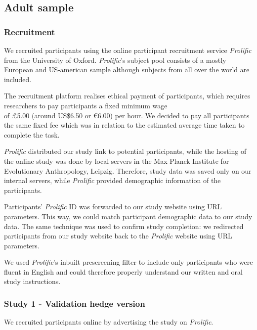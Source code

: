 \documentclass[
  english,
  man,floatsintext]{apa6}
\begin{document}
\hypertarget{adult-sample}{%
\subsection{Adult sample}\label{adult-sample}}

\hypertarget{recruitment}{%
\subsubsection{Recruitment}\label{recruitment}}

We recruited participants using the online participant recruitment service
\emph{Prolific} from the University of Oxford.
\emph{Prolific}'s subject pool consists of a mostly European and US-american sample
although subjects from all over the world are included.

The recruitment platform realises ethical payment of participants,
which requires researchers to pay participants a fixed minimum wage\\
of £5.00 (around US\$6.50 or €6.00) per hour.
We decided to pay all participants the same fixed fee which was in relation
to the estimated average time taken to complete the task.

\emph{Prolific} distributed our study link to potential participants,
while the hosting of the online study was done by local servers in the
Max Planck Institute for Evolutionary Anthropology, Leipzig.
Therefore, study data was saved only on our internal servers,
while \emph{Prolific} provided demographic information of the participants.

Participants' \emph{Prolific} ID was forwarded to our study website using URL parameters.
This way, we could match participant demographic data to our study data.
The same technique was used to confirm study completion:
we redirected participants from our study website back to the \emph{Prolific} website
using URL parameters.

We used \emph{Prolific}'s inbuilt prescreening filter to include
only participants who were fluent in English
and could therefore properly understand our written and oral study instructions.

\hypertarget{study-1---validation-hedge-version}{%
\subsubsection{Study 1 - Validation hedge version}\label{study-1---validation-hedge-version}}

We recruited participants online by advertising the study on \emph{Prolific}.
\end{document}
